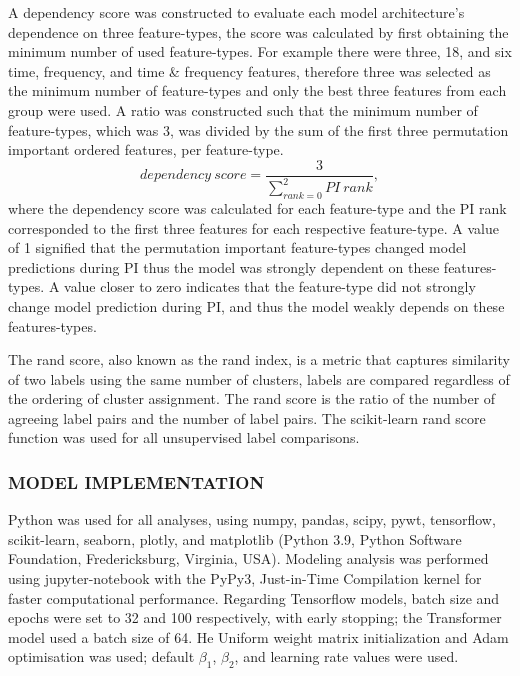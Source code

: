 \documentclass{ieeeaccess}
\begin{document}
A dependency score was constructed to evaluate each model architecture's dependence on three feature-types, the score was calculated by first obtaining the minimum number of used feature-types. For example there were three, 18, and six time, frequency, and time \& frequency features, therefore three was selected as the minimum number of feature-types and only the best three features from each group were used. A ratio was constructed such that the minimum number of feature-types, which was 3, was divided by the sum of the first three permutation important ordered features, per feature-type.
\begin{equation}
dependency~score = \dfrac{3}{\sum\limits_{rank=0}^{2}  PI~rank},
\label{dependency_score}
\end{equation}
where the dependency score was calculated for each feature-type and the PI rank corresponded to the first three features for each respective feature-type. A value of 1 signified that the permutation important feature-types changed model predictions during PI thus the model was strongly dependent on these features-types. A value closer to zero indicates that the feature-type did not strongly change model prediction during PI, and thus the model weakly depends on these features-types.

The rand score, also known as the rand index, is a metric that captures similarity of two labels using the same number of clusters, labels are compared regardless of the ordering of cluster assignment. The rand score is the ratio of the number of agreeing label pairs and the number of label pairs. The scikit-learn rand score function was used for all unsupervised label comparisons.


\subsubsection{MODEL IMPLEMENTATION}
Python was used for all analyses, using numpy, pandas, scipy, pywt, tensorflow, scikit-learn, seaborn, plotly, and matplotlib (Python 3.9, Python Software Foundation, Fredericksburg, Virginia, USA). Modeling analysis was performed using jupyter-notebook with the PyPy3, Just-in-Time Compilation kernel for faster computational performance. Regarding Tensorflow models, batch size and epochs were set to 32 and 100 respectively, with early stopping; the Transformer model used a batch size of 64. He Uniform weight matrix initialization and Adam optimisation was used; default $\beta_1$, $\beta_2$, and learning rate values were used.
\end{document}
